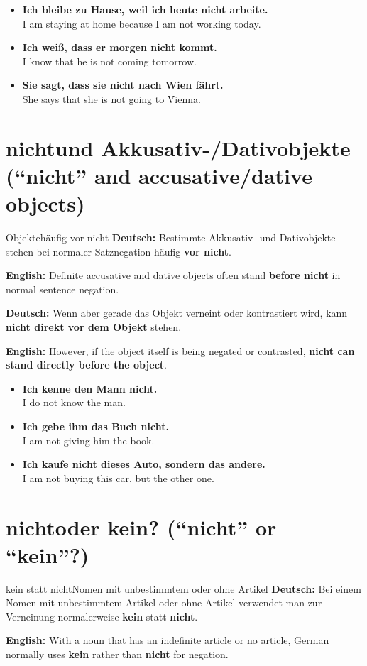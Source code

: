 \documentclass[a4paper,11pt]{article}
\newcommand{\GermanText}[1]{\textbf{Deutsch: }#1\par}
\newcommand{\EnglishText}[1]{{\small\color{SoftGray}\textbf{English: }#1\par}}
\newcommand{\ExampleItem}[2]{\item \textbf{#1}\\{\small\color{SoftGray}#2}}
\begin{document}
\begin{exbox}
\begin{itemize}
\ExampleItem{Ich bleibe zu Hause, weil ich heute \textbf{nicht arbeite}.}{I am staying at home because I am not working today.}
\ExampleItem{Ich weiß, dass er morgen \textbf{nicht kommt}.}{I know that he is not coming tomorrow.}
\ExampleItem{Sie sagt, dass sie \textbf{nicht nach Wien fährt}.}{She says that she is not going to Vienna.}
\end{itemize}
\end{exbox}

\section{\glqq nicht\grqq und Akkusativ-/Dativobjekte \textnormal{(``nicht'' and accusative/dative objects)}}

\begin{grammarentry}{Objekte}{häufig vor nicht}
\GermanText{Bestimmte Akkusativ- und Dativobjekte stehen bei normaler Satznegation häufig \textbf{vor nicht}.}
\EnglishText{Definite accusative and dative objects often stand \textbf{before nicht} in normal sentence negation.}

\GermanText{Wenn aber gerade das Objekt verneint oder kontrastiert wird, kann \textbf{nicht direkt vor dem Objekt} stehen.}
\EnglishText{However, if the object itself is being negated or contrasted, \textbf{nicht can stand directly before the object}.}
\end{grammarentry}

\begin{exbox}
\begin{itemize}
\ExampleItem{Ich kenne den Mann \textbf{nicht}.}{I do not know the man.}
\ExampleItem{Ich gebe ihm das Buch \textbf{nicht}.}{I am not giving him the book.}
\ExampleItem{Ich kaufe \textbf{nicht dieses Auto}, sondern das andere.}{I am not buying this car, but the other one.}
\end{itemize}
\end{exbox}

\section{\glqq nicht\grqq oder \glqq kein\grqq? \textnormal{(``nicht'' or ``kein''?)}}

\begin{grammarentry}{kein statt nicht}{Nomen mit unbestimmtem oder ohne Artikel}
\GermanText{Bei einem Nomen mit unbestimmtem Artikel oder ohne Artikel verwendet man zur Verneinung normalerweise \textbf{kein} statt \textbf{nicht}.}
\EnglishText{With a noun that has an indefinite article or no article, German normally uses \textbf{kein} rather than \textbf{nicht} for negation.}
\end{grammarentry}
\end{document}
